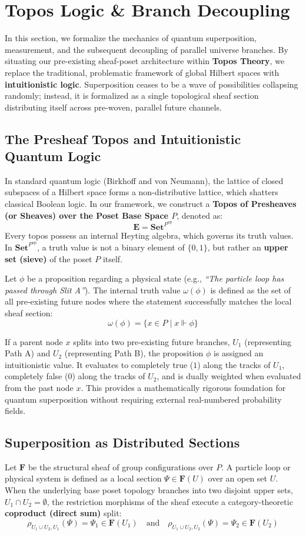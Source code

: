 \documentclass[12pt,letterpaper]{article}
\begin{document}
\section{Topos Logic \& Branch Decoupling}

In this section, we formalize the mechanics of quantum superposition, measurement, and the subsequent decoupling of parallel universe branches. By situating our pre-existing sheaf-poset architecture within \textbf{Topos Theory}, we replace the traditional, problematic framework of global Hilbert spaces with \textbf{intuitionistic logic}. Superposition ceases to be a wave of possibilities collapsing randomly; instead, it is formalized as a single topological sheaf section distributing itself across pre-woven, parallel future channels.

\subsection{The Presheaf Topos and Intuitionistic Quantum Logic}
In standard quantum logic (Birkhoff and von Neumann), the lattice of closed subspaces of a Hilbert space forms a non-distributive lattice, which shatters classical Boolean logic. In our framework, we construct a \textbf{Topos of Presheaves (or Sheaves) over the Poset Base Space $P$}, denoted as:
$$\mathbf{E} = \mathbf{Set}^{P^{\text{op}}}$$
Every topos possess an internal Heyting algebra, which governs its truth values. In $\mathbf{Set}^{P^{\text{op}}}$, a truth value is not a binary element of $\{0, 1\}$, but rather an \textbf{upper set (sieve)} of the poset $P$ itself.

Let $\phi$ be a proposition regarding a physical state (e.g., \textit{``The particle loop has passed through Slit A''}). The internal truth value $\omega(\phi)$ is defined as the set of all pre-existing future nodes where the statement successfully matches the local sheaf section:
$$\omega(\phi) = \{ x \in P \mid x \Vdash \phi \}$$

If a parent node $x$ splits into two pre-existing future branches, $U_1$ (representing Path A) and $U_2$ (representing Path B), the proposition $\phi$ is assigned an intuitionistic value. It evaluates to completely true ($1$) along the tracks of $U_1$, completely false ($0$) along the tracks of $U_2$, and is dually weighted when evaluated from the past node $x$. This provides a mathematically rigorous foundation for quantum superposition without requiring external real-numbered probability fields.

\subsection{Superposition as Distributed Sections}
Let $\mathbf{F}$ be the structural sheaf of group configurations over $P$. A particle loop or physical system is defined as a local section $\Psi \in \mathbf{F}(U)$ over an open set $U$. When the underlying base poset topology branches into two disjoint upper sets, $U_1 \cap U_2 = \emptyset$, the restriction morphisms of the sheaf execute a category-theoretic \textbf{coproduct (direct sum)} split:
$$\rho_{U_1 \cup U_2, U_1}(\Psi) = \Psi_1 \in \mathbf{F}(U_1) \quad \text{and} \quad \rho_{U_1 \cup U_2, U_2}(\Psi) = \Psi_2 \in \mathbf{F}(U_2)$$
\end{document}
